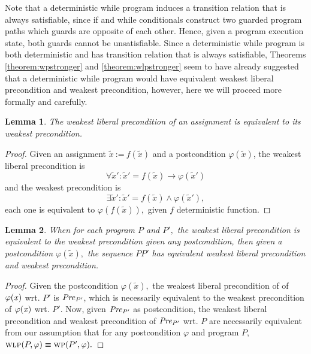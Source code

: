 \documentclass[times]{elsarticle}
\newcommand{\pred}[1]{\mbox{\textit{#1}}}
\newtheorem{lemma}{Lemma}
\newcommand{\passign}{\mbox{:=}}
\newcommand{\WP}{\mbox{\textsc{wp}}}
\newcommand{\WLP}{\mbox{\textsc{wlp}}}
\begin{document}
Note that a deterministic while program induces a transition relation
that is always satisfiable, since if and while conditionals construct
two guarded program paths which guards are opposite of each
other. Hence, given a program execution state, both guards cannot be
unsatisfiable. Since a deterministic while program is both
deterministic and has transition relation that is always satisfiable,
Theorems \ref{theorem:wpstronger} and \ref{theorem:wlpstronger} seem
to have already suggested that a deterministic while program would
have equivalent weakest liberal precondition and weakest precondition,
however, here we will proceed more formally and carefully.
\begin{lemma} \label{lemma:equivalent}
The weakest liberal precondition of an assignment is equivalent to its weakest precondition.
\end{lemma}

\begin{proof}
  Given an assignment $\tilde{x} ~\passign~ f(\tilde{x})$ and a postcondition $\varphi(\tilde{x})$, the
  weakest liberal precondition is
\[
\forall \tilde{x}' : \tilde{x}'=f(\tilde{x}) \rightarrow \varphi(\tilde{x}')
\]
and the weakest precondition is 
\[
\exists \tilde{x}' : \tilde{x}'=f(\tilde{x}) \wedge \varphi(\tilde{x}'),
\]
each one is equivalent to $\varphi(f(\tilde{x})),$ given $f$ deterministic
function.
\end{proof}

\begin{lemma} \label{lemma:sequence}
  When for each program $P$ and $P',$ the weakest liberal
  precondition is equivalent to the weakest precondition given any
  postcondition, then given a postcondition $\varphi(\tilde{x}),$
  the sequence $P P'$ has equivalent weakest liberal precondition and
  weakest precondition.
\end{lemma}

\begin{proof}
  Given the postcondition $\varphi(\tilde{x}),$ the weakest
  liberal precondition of of $\varphi(\pred{x})$ wrt. $P'$ is
  $\pred{Pre}_{P'}$, which is necessarily equivalent to the weakest
  precondition of $\varphi(\pred{x})$ wrt. $P'$. Now, given
  $\pred{Pre}_{P'}$ as postcondition, the weakest liberal precondition
  and weakest precondition of $\pred{Pre}_{P'}$ wrt. $P$ are
  necessarily equivalent from our assumption that for any
  postcondition $\varphi$ and program $P,$ $\WLP(P,\varphi)
  \equiv \WP(P', \varphi).$
\end{proof}
\end{document}
